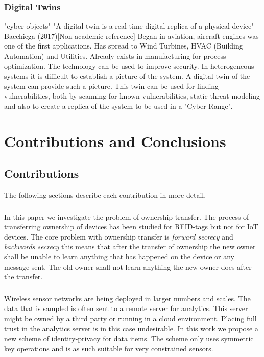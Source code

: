 \subsection{Digital Twins}
\label{sec:digital_twins}
"cyber objects"
"A digital twin is a real time digital replica of a physical device" 	Bacchiega (2017)[Non academic reference]
Began in aviation, aircraft engines was one of the first applications. Has spread to Wind Turbines, HVAC (Building Automation) and Utilities. 
Already exists in manufacturing for process optimization. The technology can be used to improve security. In heterogeneous systems it is difficult to establish a picture of the system. A digital twin of the system can provide such a picture. This twin can be used for finding vulnerabilities, both by scanning for known vulnerabilities, static threat modeling and also to create a replica of the system to be used in a "Cyber Range". 

\chapter{Contributions and Conclusions}
\label{ch:coc}
\section{Contributions}
The following sections describe each contribution in more detail.

\subsection{\paperItitle}
In this paper we investigate the problem of ownership transfer. The process of transferring ownership of devices has been studied for RFID-tags but not for IoT devices. The core problem with ownership transfer is \emph{forward secrecy} and \emph{backwards secrecy} this means that after the transfer of ownership the new owner shall be unable to learn anything that has happened on the device or any message sent. The old owner shall not learn anything the new owner does after the transfer.

\subsection{\paperIItitle}
Wireless sensor networks are being deployed in larger numbers and scales. The data that is sampled is often sent to a remote server for analytics. This server might be owned by a third party or running in a cloud environment. Placing full trust in the analytics server is in this case undesirable. In this work we propose a new scheme of identity-privacy for data items. The scheme only uses symmetric key operations and is as such suitable for very constrained sensors.

